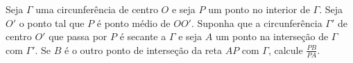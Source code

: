 Seja $\Gamma$ uma circunferência de centro $O$ e seja $P$ um ponto no interior de $\Gamma$.
Seja $O'$ o ponto tal que $P$ é ponto médio de $OO'$.
Suponha que a circunferência $\Gamma'$ de centro $O'$ que passa por $P$ é secante a $\Gamma$ e seja $A$ um ponto na interseção de $\Gamma$ com $\Gamma'$.
Se $B$ é o outro ponto de interseção da reta $AP$ com $\Gamma$, calcule $\frac{PB}{PA}$.
